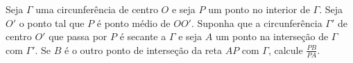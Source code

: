 Seja $\Gamma$ uma circunferência de centro $O$ e seja $P$ um ponto no interior de $\Gamma$.
Seja $O'$ o ponto tal que $P$ é ponto médio de $OO'$.
Suponha que a circunferência $\Gamma'$ de centro $O'$ que passa por $P$ é secante a $\Gamma$ e seja $A$ um ponto na interseção de $\Gamma$ com $\Gamma'$.
Se $B$ é o outro ponto de interseção da reta $AP$ com $\Gamma$, calcule $\frac{PB}{PA}$.
